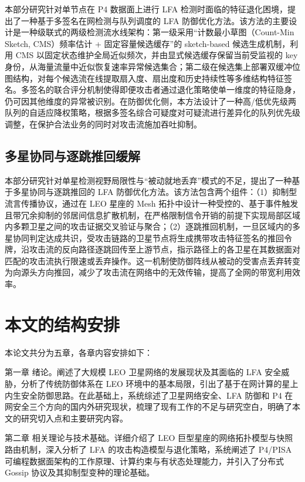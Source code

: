 本部分研究针对单节点在 P4 数据面上进行 LFA 检测时面临的特征退化困境，提出了一种基于多签名在网检测与队列调度的 LFA 防御优化方法。该方法的主要设计是一种级联式的两级检测流水线架构：第一级采用“计数最小草图（Count-Min Sketch, CMS）频率估计 + 固定容量候选缓存”的 sketch-based 候选生成机制，利用 CMS 以固定状态维护全局近似频次，并由显式候选缓存保留当前受监视的 key 身份，从海量流量中近似恢复速率异常候选集合；第二级在候选集上部署双缓冲位图结构，对每个候选流在线提取扇入度、扇出度和历史持续性等多维结构特征签名。多签名的联合评分机制使得即便攻击者通过退化策略使单一维度的特征隐身，仍可因其他维度的异常被识别。在防御优化侧，本方法设计了一种高/低优先级两队列的自适应降权策略，根据多签名综合可疑度对可疑流进行差异化的队列优先级调整，在保护合法业务的同时对攻击流施加吞吐抑制。

\subsection{多星协同与逐跳推回缓解}

本部分研究针对单星检测视野局限性与“被动就地丢弃”模式的不足，提出了一种基于多星协同与逐跳推回的 LFA 防御优化方法。该方法包含两个组件：（1）抑制型流言传播协议，通过在 LEO 星座的 Mesh 拓扑中设计一种受控的、基于事件触发且带冗余抑制的邻居间信息扩散机制，在严格限制信令开销的前提下实现局部区域内多颗卫星之间的攻击证据交叉验证与聚合；（2）逐跳推回机制，一旦区域内的多星协同判定达成共识，受攻击链路的卫星节点将生成携带攻击特征签名的推回令牌，沿攻击流的反向路径逐跳回传至上游节点，指示路径上的各卫星在其数据面对匹配的攻击流执行限速或丢弃操作。这一机制使防御阵线从被动的受害点丢弃转变为向源头方向推回，减少了攻击流在网络中的无效传输，提高了全网的带宽利用效率。

\section{本文的结构安排}

本论文共分为五章，各章内容安排如下：

第一章 绪论。阐述了大规模 LEO 卫星网络的发展现状及其面临的 LFA 安全威胁，分析了传统防御体系在 LEO 环境中的基本局限，引出了基于在网计算的星上内生安全防御思路。在此基础上，系统综述了卫星网络安全、LFA 防御和 P4 在网安全三个方向的国内外研究现状，梳理了现有工作的不足与研究空白，明确了本文的研究切入点和主要研究内容。

第二章 相关理论与技术基础。详细介绍了 LEO 巨型星座的网络拓扑模型与快照路由机制，深入分析了 LFA 的攻击构造模型与退化策略，系统阐述了 P4/PISA 可编程数据面架构的工作原理、计算约束与有状态处理能力，并引入了分布式 Gossip 协议及其抑制型变种的理论基础。

